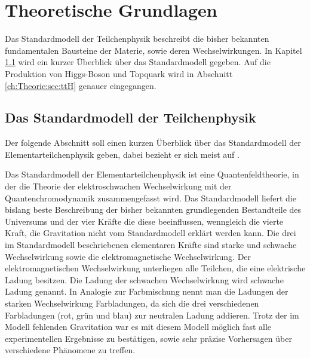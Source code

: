 \chapter{Theoretische Grundlagen}
\label{ch:Theorie}

{}	%

Das Standardmodell der Teilchenphysik beschreibt die bisher bekannten fundamentalen Bausteine der Materie, sowie deren Wechselwirkungen. In Kapitel \ref{ch:Theorie:sec:Standardmodell} wird ein kurzer \"Uberblick \"uber das Standardmodell gegeben. Auf die Produktion von Higgs-Boson und Topquark wird in Abschnitt \ref{ch:Theorie:sec:ttH} genauer eingegangen.\\


\section{Das Standardmodell der Teilchenphysik}
\label{ch:Theorie:sec:Standardmodell}

Der folgende Abschnitt soll einen kurzen \"Uberblick \"uber das Standardmodell der Elementarteilchenphysik geben, dabei bezieht er sich meist auf \cite{SWB-39819646X}.

Das Standardmodell der Elementarteilchenphysik ist eine Quantenfeldtheorie, in der die Theorie der elektroschwachen Wechselwirkung mit der Quantenchromodynamik zusammengefasst wird.%
Das Standardmodell liefert die bislang beste Beschreibung der bisher bekannten grundlegenden Bestandteile des Universums und der vier Kr\"afte die diese beeinflussen, wenngleich die vierte Kraft, die Gravitation nicht vom Standardmodell erkl\"art werden kann. Die drei im Standardmodell beschriebenen elementaren Kr\"afte sind starke und schwache Wechselwirkung sowie die elektromagnetische Wechselwirkung. Der elektromagnetischen Wechselwirkung unterliegen alle Teilchen, die eine elektrische Ladung besitzen. Die Ladung der schwachen Wechselwirkung wird schwache Ladung genannt. In Analogie zur Farbmischung nennt man die Ladungen der starken Wechselwirkung Farbladungen, da sich die drei verschiedenen Farbladungen (rot, gr\"un und blau) zur neutralen Ladung addieren. Trotz der im Modell fehlenden Gravitation war es mit diesem Modell m\"oglich fast alle experimentellen Ergebnisse zu best\"atigen, sowie sehr pr\"azise Vorhersagen \"uber verschiedene Ph\"anomene zu treffen.

